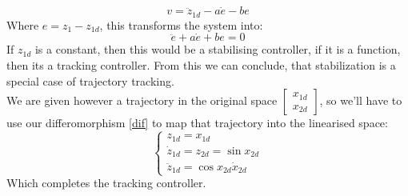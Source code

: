 {        \begin{equation}
            v = \ddot{z}_{1d} -a\dot{e} -be
        \end{equation}
        Where $e = z_1 - z_{1d}$, this transforms the system into:
        \begin{equation}
             \ddot{e} + a\dot{e} +be = 0
        \end{equation}
        If $z_{1d}$ is a constant, then this would be a stabilising controller, if it is a function, then its a tracking controller. From this we can conclude, that stabilization is a special case of trajectory tracking.\\
        We are given however a trajectory in the original space $\begin{bmatrix}
            x_{1d} \\ x_{2d}
        \end{bmatrix}$, so we'll have to use our differomorphism \ref{dif} to map that trajectory into the linearised space:
        \begin{equation}
          \begin{cases}
              z_{1d} = x_{1d}\\
              \dot{z}_{1d} = z_{2d} = \sin{x_{2d}}\\
              \ddot{z}_{1d} = \cos{x_{2d}}\dot{x}_{2d}
          \end{cases} 
        \end{equation}
        Which completes the tracking controller.
}



